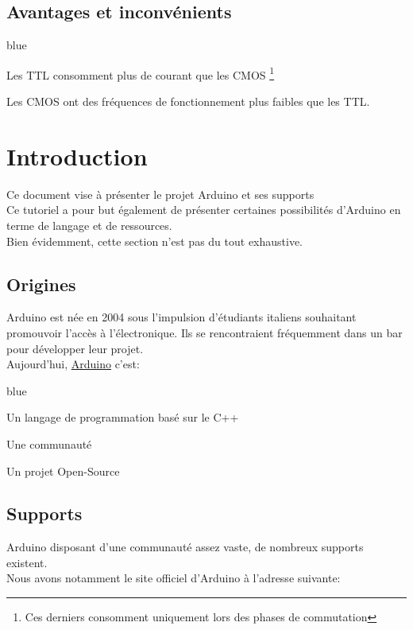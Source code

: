 \section{Avantages et inconvénients}

\begin{items}{blue}{\Triangle}
    \item Les TTL consomment plus de courant que les CMOS \footnote{Ces derniers consomment uniquement lors des phases de commutation}
    \item Les CMOS ont des fréquences de fonctionnement plus faibles que les TTL.
\end{items}%
\chapter{Introduction}

Ce document vise à présenter le projet Arduino et ses supports\\
Ce tutoriel a pour but également de présenter certaines possibilités d'Arduino en terme de langage et de 
ressources. \\
Bien évidemment, cette section n'est pas du tout exhaustive.

\section{Origines}

Arduino est née en 2004 sous l'impulsion d'étudiants italiens souhaitant promouvoir l'accès à  l'électronique. 
Ils se rencontraient fréquemment dans un bar pour développer leur projet. \\
Aujourd'hui, \underline{Arduino} c'est:
\begin{items}{blue}{\Triangle}
\item Un langage de programmation basé sur le C++
\item Une communauté
\item Un projet Open-Source
\end{items}

\section{Supports}

Arduino disposant d'une communauté assez vaste, de nombreux supports existent. \\
Nous avons notamment le site officiel d'Arduino à l'adresse suivante:


